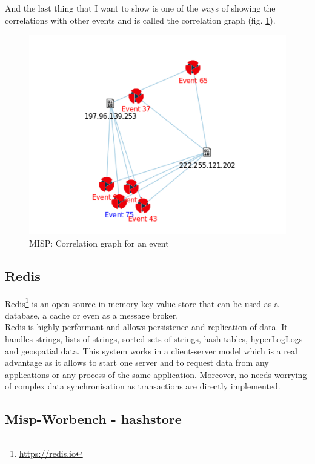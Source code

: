 \documentclass{eplmastersthesis}
\begin{document}
And the last thing that I want to show is one of the ways of showing the correlations with other events and is called the correlation graph (fig. \ref{webcorrelation}).
\begin{figure}[!h]
	\begin{center}
		\includegraphics[scale=0.35]{res/webCorrelationGraph}
		\caption{MISP: Correlation graph for an event}
		\label{webcorrelation}
	\end{center}
\end{figure}


\subsection{Redis}
Redis\footnote{\url{https://redis.io}} is an open source in memory key-value store that can be used as a database, a cache or even as a message broker.\\

Redis is highly performant and allows persistence and replication of data. It handles strings, lists of strings, sorted sets of strings, hash tables, hyperLogLogs and geospatial data. This system works in a client-server model which is a real advantage as it allows to start one server and to request data from any applications or any process of the same application. Moreover, no needs worrying of complex data synchronisation as transactions are directly implemented.


\subsection{Misp-Worbench - hashstore}
\end{document}
